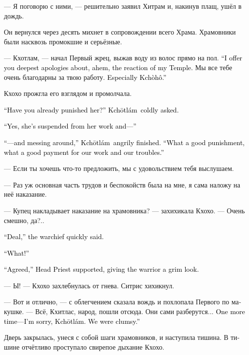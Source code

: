 \documentclass[a4paper,12pt,fleqn]{book}\usepackage{cooltooltips}\usepackage{polyglossia}\setdefaultlanguage{russian}\setotherlanguage{english}\defaultfontfeatures{Ligatures=TeX,Mapping=tex-text} \usepackage{xcolor}\definecolor{lightgray}{HTML}{bbbbbb}\color{lightgray}\newcommand{\ml}[3]{\textenglish{\textcolor{black}{#3}}}
\newcommand{\Kchoho}{Kch\`{o}h\^{o}}
\newcommand{\Kchotlam}{Kch\={o}tl\'{a}m}
\begin{document}
--- Я поговорю с ними, --- решительно заявил Хитрам и, накинув плащ, ушёл в дождь.

Он вернулся через десять михнет в сопровождении всего Храма.
Храмовники были насквозь промокшие и серьёзные.

--- Кхотлам, --- начал Первый жрец, выжав воду из волос прямо на пол.
\ml{$0$}
{--- Я приношу тебе глубочайшие извинения за, кхм, реакцию моего Храма.}
{``I offer you deepest apologies about, ahem, the reaction of my Temple.}
Мы все тебе очень благодарны за твою работу.
\ml{$0$}
{Особенно Кхохо.}
{Especially \Kchoho.''}

Кхохо прожгла его взглядом и промолчала.

\ml{$0$}
{--- Вы уже наложили на неё наказание? --- осведомилась Кхотлам.}
{``Have you already punished her?'' \Kchotlam\ coldly asked.}

\ml{$0$}
{--- Да, мы отстранили её от работы и...}
{``Yes, she's suspended from her work and---''}

\ml{$0$}
{--- ...и она бездельничает, --- раздражённо закончила Кхотлам.}
{``---and messing around,'' \Kchotlam\ angrily finished.}
\ml{$0$}
{--- Отличное наказание, отличная плата за все наши труды и беспокойства.}
{``What a good punishment, what a good payment for our work and our troubles.''}

--- Если ты хочешь что-то предложить, мы с удовольствием тебя выслушаем.

--- Раз уж основная часть трудов и беспокойств была на мне, я сама наложу на неё наказание.

--- Купец накладывает наказание на храмовника? --- захихикала Кхохо.
--- Очень смешно, да?..

\ml{$0$}
{--- Идёт, --- быстро сказала вождь.}
{``Deal,'' the warchief quickly said.}

\ml{$0$}
{--- Что?!}
{``What!''}

\ml{$0$}
{--- Договорились, --- поддержал Первый жрец, с неодобрением глядя на воительницу.}
{``Agreed,'' Head Priest supported, giving the warrior a grim look.}

--- Ы! --- Кхохо захлебнулась от гнева.
Ситрис хихикнул.

--- Вот и отлично, --- с облегчением сказала вождь и похлопала Первого по макушке.
--- Всё, Кхитлас, народ, пошли отсюда.
Они сами разберутся...
\ml{$0$}
{Прости ещё раз, Кхотлам.}
{One more time---I'm sorry, \Kchotlam.}
\ml{$0$}
{Мы сглупили.}
{We were clumsy.''}

Дверь закрылась, унеся с собой шаги храмовников, и наступила тишина.
В тишине отчётливо проступало свирепое дыхание Кхохо.
\end{document}
